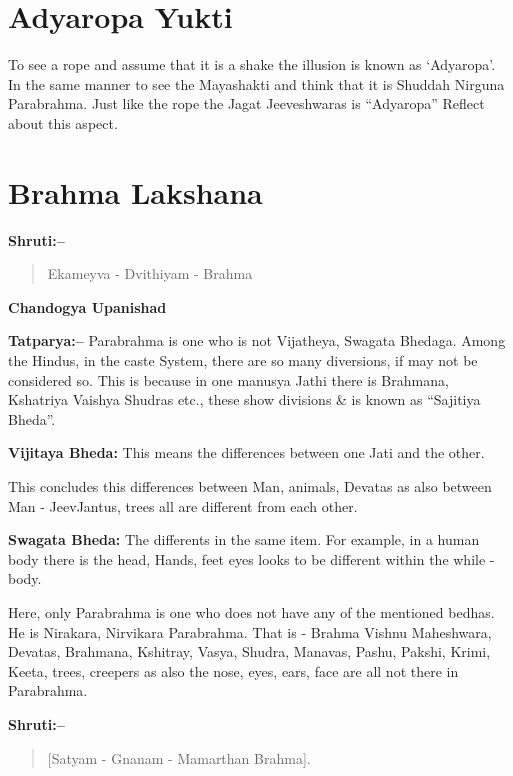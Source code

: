 \chapter{Adyaropa Yukti}

To see a rope and assume that it is a shake the illusion is known as ‘Adyaropa’. In the same manner to see the Mayashakti and think that it is Shuddah Nirguna Parabrahma. Just like the rope the Jagat Jeeveshwaras is “Adyaropa” Reflect about this aspect.

\chapter{Brahma Lakshana}

\textbf{Shruti:–}

\begin{verse}
Ekameyva - Dvithiyam - Brahma
\end{verse}

\begin{flushright}
\textbf{Chandogya Upanishad}
\end{flushright}

\textbf{Tatparya:–} Parabrahma is one who is not Vijatheya, Swagata Bhedaga. Among the Hindus, in the caste System, there are so many diversions, if may not be considered so. This is because in one manusya Jathi there is Brahmana, Kshatriya Vaishya Shudras etc., these show divisions \& is known as “Sajitiya Bheda”.

\textbf{Vijitaya Bheda:} This means the differences between one Jati and the other.

This concludes this differences between Man, animals, Devatas as also between Man - JeevJantus, trees all are different from each other.

\textbf{Swagata Bheda:} The differents in the same item. For example, in a human body there is the head, Hands, feet eyes looks to be different within the while - body.

Here, only Parabrahma is one who does not have any of the mentioned bedhas. He is Nirakara, Nirvikara Parabrahma. That is - Brahma Vishnu Maheshwara, Devatas, Brahmana, Kshitray, Vasya, Shudra, Manavas, Pashu, Pakshi, Krimi, Keeta, trees, creepers as also the nose, eyes, ears, face are all not there in Parabrahma.

\newpage

\textbf{Shruti:–}

\begin{verse}
[Satyam - Gnanam - Mamarthan Brahma].
\end{verse}

